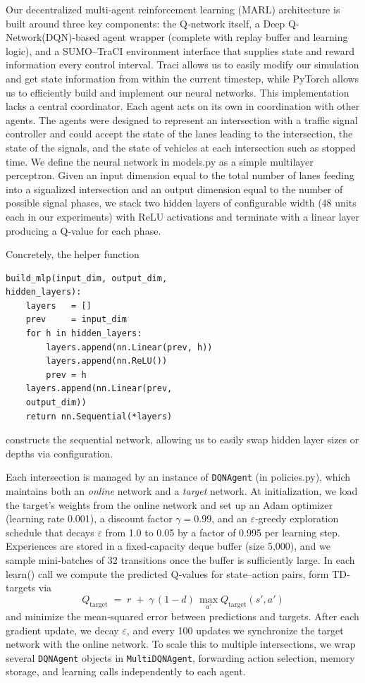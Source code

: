 \documentclass[conference]{IEEEtran}
\begin{document}
Our decentralized multi‐agent reinforcement learning (MARL) architecture is built around three key components: the Q‐network itself, a Deep Q-Network(DQN)‐based agent wrapper (complete with replay buffer and learning logic), and a SUMO–TraCI environment interface that supplies state and reward information every control interval. Traci allows us to easily modify our simulation and get state information from within the current timestep, while PyTorch allows us to efficiently build and implement our neural networks. This implementation lacks a central coordinator. Each agent acts on its own in coordination with other agents. The agents were designed to represent an intersection with a traffic signal controller and could accept the state of the lanes leading to the intersection, the state of the signals, and the state of vehicles at each intersection such as stopped time. We define the neural network in models.py as a simple multilayer perceptron. Given an input dimension equal to the total number of lanes feeding into a signalized intersection and an output dimension equal to the number of possible signal phases, we stack two hidden layers of configurable width (48 units each in our experiments) with ReLU activations and terminate with a linear layer producing a Q‐value for each phase. 

\newpage 
Concretely, the helper function
\begin{verbatim}
build_mlp(input_dim, output_dim, 
hidden_layers):
    layers   = []
    prev     = input_dim
    for h in hidden_layers:
        layers.append(nn.Linear(prev, h))
        layers.append(nn.ReLU())
        prev = h
    layers.append(nn.Linear(prev, 
    output_dim))
    return nn.Sequential(*layers)
\end{verbatim}
constructs the sequential network, allowing us to easily swap hidden layer sizes or depths via configuration.

Each intersection is managed by an instance of {\tt DQNAgent} (in policies.py), which maintains both an \emph{online} network and a \emph{target} network. At initialization, we load the target’s weights from the online network and set up an Adam optimizer (learning rate 0.001), a discount factor $\gamma=0.99$, and an $\varepsilon$‐greedy exploration schedule that decays $\varepsilon$ from 1.0 to 0.05 by a factor of 0.995 per learning step. Experiences are stored in a fixed‐capacity deque buffer (size 5,000), and we sample mini‐batches of 32 transitions once the buffer is sufficiently large. In each learn() call we compute the predicted Q‐values for state–action pairs, form TD‐targets via 
\[
Q_{\mathrm{target}} \;=\; r \;+\; \gamma\,(1 - d)\,\max_{a'} Q_{\mathrm{target}}(s', a')
\]
and minimize the mean‐squared error between predictions and targets. After each gradient update, we decay $\varepsilon$, and every 100 updates we synchronize the target network with the online network. To scale this to multiple intersections, we wrap several {\tt DQNAgent} objects in {\tt MultiDQNAgent}, forwarding action selection, memory storage, and learning calls independently to each agent.
\end{document}
